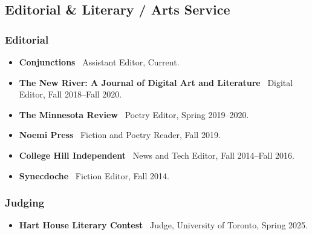 \subsection{Editorial \& Literary / Arts Service}

\subsubsection{Editorial}
\begin{itemize}
    \item \textbf{Conjunctions} \textemdash\ Assistant Editor, Current.
    \item \textbf{The New River: A Journal of Digital Art and Literature} \textemdash\ Digital Editor, Fall 2018--Fall 2020.
    \item \textbf{The Minnesota Review} \textemdash\ Poetry Editor, Spring 2019--2020.
    \item \textbf{Noemi Press} \textemdash\ Fiction and Poetry Reader, Fall 2019.
    \item \textbf{College Hill Independent} \textemdash\ News and Tech Editor, Fall 2014--Fall 2016.
    \item \textbf{Synecdoche} \textemdash\ Fiction Editor, Fall 2014.
\end{itemize}

\subsubsection{Judging}
\begin{itemize}
    \item \textbf{Hart House Literary Contest} \textemdash\ Judge, University of Toronto, Spring 2025.
\end{itemize}
